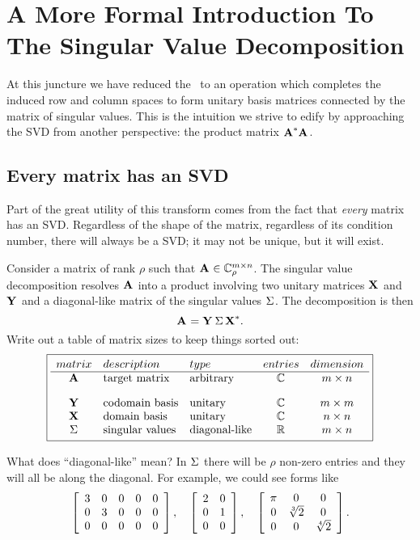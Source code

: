 \chapter[A More Formal Introduction]{A More Formal Introduction To The Singular Value Decomposition}
\label{chap:moreformal}

At this juncture we have reduced the \svdp \ to an operation which completes the induced row and column spaces to form unitary basis matrices connected by the matrix of singular values. This is the intuition we strive to edify by approaching the SVD from another perspective: the product matrix $\prdm{*}$.

\section{Every matrix has an SVD}

Part of the great utility of this transform comes from the fact that \textit{every} matrix has an SVD. Regardless of the shape of the matrix, regardless of its condition number, there will always be a SVD; it may not be unique, but it will exist.

Consider a matrix of rank $\rho$ such that $\Acc{m}{n}_{\rho}$. The singular value decomposition resolves $ \A{} $ into a product involving two unitary matrices $ \X{} $ and $ \Y{} $ and a diagonal-like matrix of the singular values $ \sig{} $. The decomposition is then
\begin{equation}
  \svdax{*}.
\end{equation}
Write out a table of matrix sizes to keep things sorted out:
$$
\boxed{
\begin{array}{ cllcc }
matrix & description & type & entries & dimension \\ \hline
 \A{}  & \text{target matrix} & \text{arbitrary} & \cmplx{} & m \times n \\[10pt]
 \Y{}  & \text{codomain basis} & \text{unitary} & \cmplx{} & m \times m \\
 \X{}  & \text{domain basis} & \text{unitary}& \cmplx{} & n \times n \\
 \sig{}& \text{singular values} & \text{diagonal-like} & \real{} & m \times n
\end{array}
}
$$

What does ``diagonal-like'' mean? In $ \sig{} $ there will be $ \rho $ non-zero entries and they will all be along the diagonal. For example, we could see forms like
\begin{equation}
  \mat{ccccc}
  {
  3 & 0 & 0 & 0 & 0\\
  0 & 3 & 0 & 0 & 0\\
  0 & 0 & 0 & 0 & 0\\
  }, \quad
  \mat{cc}
  {
  2 & 0\\
  0 & 1\\
  0 & 0\\
  }, \quad
  \mat{ccc}
  {
  \pi & 0           & 0\\
  0   & \sqrt[3]{2} & 0\\
  0   & 0           & \sqrt[4]{2}\\
  }.
\end{equation}

